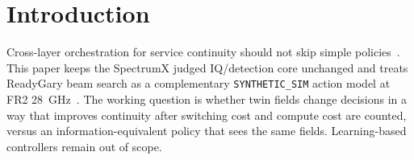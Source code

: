 \section{Introduction}
Cross-layer orchestration for service continuity should not skip simple policies~\cite{itur_m2160,3gpp_ts22261}.
This paper keeps the SpectrumX judged IQ/detection core unchanged and treats ReadyGary beam search as a complementary \texttt{SYNTHETIC\_SIM} action model at FR2 28~GHz~\cite{3gpp_ts38101_2}.
The working question is whether twin fields change decisions in a way that improves continuity after switching cost and compute cost are counted, versus an information-equivalent policy that sees the same fields.
Learning-based controllers remain out of scope.
